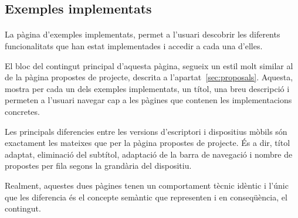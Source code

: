 \subsection{Exemples implementats}

    \paragraph{}
    La pàgina d'exemples implementats, permet a l'usuari descobrir les diferents fun\-cio\-na\-li\-tats que han estat implementades i accedir a cada una d'elles.

    El bloc del contingut principal d'aquesta pàgina, segueix un estil molt similar al de la pàgina propostes de projecte, descrita a l'apartat~\ref{sec:proposals}. Aquesta, mostra per cada un dels exemples implementats, un títol, una breu descripció i permeten a l'usuari navegar cap a les pàgines que contenen les implementacions concretes.

    Les principals diferencies entre les versions d'escriptori i dispositius mòbils són exactament les mateixes que per la pàgina propostes de projecte. És a dir, títol adaptat, eliminació del subtítol, adaptació de la barra de navegació i nombre de propostes per fila segons la grandària del dispositiu.

    Realment, aquestes dues pàgines tenen un comportament tècnic idèntic i l'únic que les diferencia és el concepte semàntic que representen i en conseqüència, el contingut.
